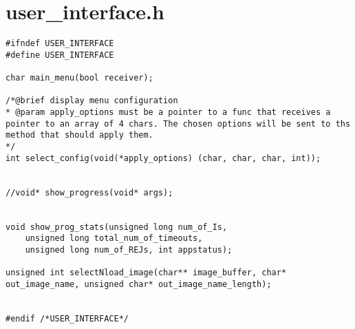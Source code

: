 \section{user\_interface.h}
\label{USERINTERFACEH}

\begin{lstlisting}
#ifndef USER_INTERFACE
#define USER_INTERFACE

char main_menu(bool receiver);

/*@brief display menu configuration
* @param apply_options must be a pointer to a func that receives a pointer to an array of 4 chars. The chosen options will be sent to ths method that should apply them.
*/
int select_config(void(*apply_options) (char, char, char, int));


//void* show_progress(void* args);


void show_prog_stats(unsigned long num_of_Is,
	unsigned long total_num_of_timeouts,
	unsigned long num_of_REJs, int appstatus);

unsigned int selectNload_image(char** image_buffer, char* out_image_name, unsigned char* out_image_name_length);


#endif /*USER_INTERFACE*/
\end{lstlisting}
